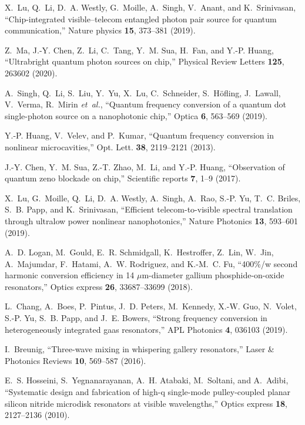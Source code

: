 \documentclass{WileyMSP-template}
\begin{document}
\begin{thebibliography}{10}
X.~Lu, Q.~Li, D.~A. Westly, G.~Moille, A.~Singh, V.~Anant, and K.~Srinivasan,
  \enquote{Chip-integrated visible--telecom entangled photon pair source for
  quantum communication,} {{Nature physics}} \textbf{15},
  373--381 (2019).

Z.~Ma, J.-Y. Chen, Z.~Li, C.~Tang, Y.~M. Sua, H.~Fan, and Y.-P. Huang,
  \enquote{Ultrabright quantum photon sources on chip,}
  {{Physical Review Letters}} \textbf{125}, 263602 (2020).

A.~Singh, Q.~Li, S.~Liu, Y.~Yu, X.~Lu, C.~Schneider, S.~H{\"o}fling, J.~Lawall,
  V.~Verma, R.~Mirin \emph{et~al.}, \enquote{Quantum frequency conversion of a
  quantum dot single-photon source on a nanophotonic chip,}
  {{Optica}} \textbf{6}, 563--569 (2019).

Y.-P. Huang, V.~Velev, and P.~Kumar, \enquote{Quantum frequency conversion in
  nonlinear microcavities,} {{Opt. Lett.}} \textbf{38},
  2119--2121 (2013).

J.-Y. Chen, Y.~M. Sua, Z.-T. Zhao, M.~Li, and Y.-P. Huang, \enquote{Observation
  of quantum zeno blockade on chip,} {{Scientific
  reports}} \textbf{7}, 1--9 (2017).

X.~Lu, G.~Moille, Q.~Li, D.~A. Westly, A.~Singh, A.~Rao, S.-P. Yu, T.~C.
  Briles, S.~B. Papp, and K.~Srinivasan, \enquote{Efficient telecom-to-visible
  spectral translation through ultralow power nonlinear nanophotonics,}
  {{Nature Photonics}} \textbf{13}, 593--601 (2019).

A.~D. Logan, M.~Gould, E.~R. Schmidgall, K.~Hestroffer, Z.~Lin, W.~Jin,
  A.~Majumdar, F.~Hatami, A.~W. Rodriguez, and K.-M.~C. Fu, \enquote{400\%/w
  second harmonic conversion efficiency in 14 $\mu$m-diameter gallium
  phosphide-on-oxide resonators,} {{Optics express}}
  \textbf{26}, 33687--33699 (2018).

L.~Chang, A.~Boes, P.~Pintus, J.~D. Peters, M.~Kennedy, X.-W. Guo, N.~Volet,
  S.-P. Yu, S.~B. Papp, and J.~E. Bowers, \enquote{Strong frequency conversion
  in heterogeneously integrated gaas resonators,} {{APL
  Photonics}} \textbf{4}, 036103 (2019).

I.~Breunig, \enquote{Three-wave mixing in whispering gallery resonators,}
  {{Laser \& Photonics Reviews}} \textbf{10}, 569--587
  (2016).

E.~S. Hosseini, S.~Yegnanarayanan, A.~H. Atabaki, M.~Soltani, and A.~Adibi,
  \enquote{Systematic design and fabrication of high-q single-mode
  pulley-coupled planar silicon nitride microdisk resonators at visible
  wavelengths,} {{Optics express}} \textbf{18}, 2127--2136
  (2010).


\end{thebibliography}
\end{document}
